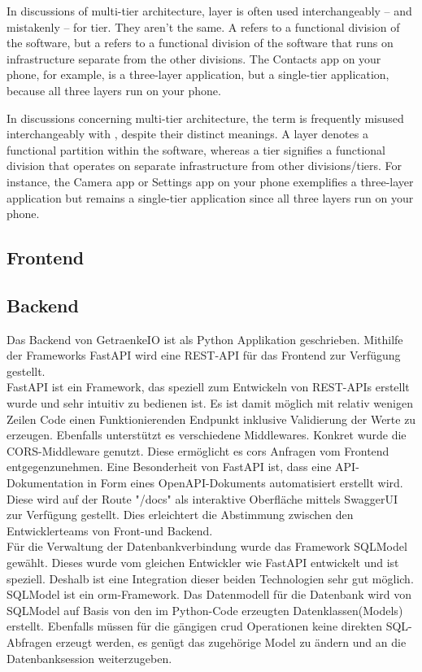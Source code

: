 \documentclass[conference,a4paper]{cs-techrep}
\begin{document}
In discussions of multi-tier architecture, layer is often used interchangeably -- and mistakenly -- for tier. They aren't the same. A  refers to a functional division of the software, but a  refers to a functional division of the software that runs on infrastructure separate from the other divisions. The Contacts app on your phone, for example, is a three-layer application, but a single-tier application, because all three layers run on your phone.

In discussions concerning multi-tier architecture, the term  is frequently misused interchangeably with , despite their distinct meanings. A layer denotes a functional partition within the software, whereas a tier signifies a functional division that operates on separate infrastructure from other divisions/tiers. For instance, the Camera app or Settings app on your phone exemplifies a three-layer application but remains a single-tier application since all three layers run on your phone.


\subsection{Frontend}
\lipsum[3]

\subsection{Backend} %
Das Backend von GetraenkeIO ist als Python Applikation geschrieben.
Mithilfe der Frameworks FastAPI wird eine REST-API für das Frontend zur Verfügung gestellt. \\  
FastAPI ist ein Framework, das speziell zum Entwickeln von REST-APIs erstellt wurde und sehr intuitiv zu bedienen ist.
Es ist damit möglich mit relativ wenigen Zeilen Code einen Funktionierenden Endpunkt inklusive Validierung der Werte zu erzeugen. Ebenfalls unterstützt es verschiedene Middlewares. Konkret wurde die CORS-Middleware genutzt. Diese ermöglicht es \ac{cors} Anfragen vom Frontend entgegenzunehmen.
Eine Besonderheit von FastAPI ist, dass eine API-Dokumentation in Form eines OpenAPI-Dokuments \cite{openapi} automatisiert erstellt wird. Diese wird auf der Route "/docs" als interaktive Oberfläche mittels SwaggerUI  \cite{swagger} zur Verfügung gestellt. Dies erleichtert die Abstimmung zwischen den Entwicklerteams von Front-und Backend. \\  
Für die Verwaltung der Datenbankverbindung wurde das Framework SQLModel gewählt. Dieses wurde vom gleichen Entwickler wie FastAPI entwickelt und ist speziell. Deshalb ist eine Integration dieser beiden Technologien sehr gut möglich. SQLModel ist ein \ac{orm}-Framework.
Das Datenmodell für die Datenbank wird von SQLModel auf Basis von den im Python-Code erzeugten Datenklassen(Models) erstellt. Ebenfalls müssen für die gängigen \ac{crud} Operationen keine direkten SQL-Abfragen erzeugt werden, es genügt das zugehörige Model  zu ändern und an die Datenbanksession weiterzugeben.
\end{document}
